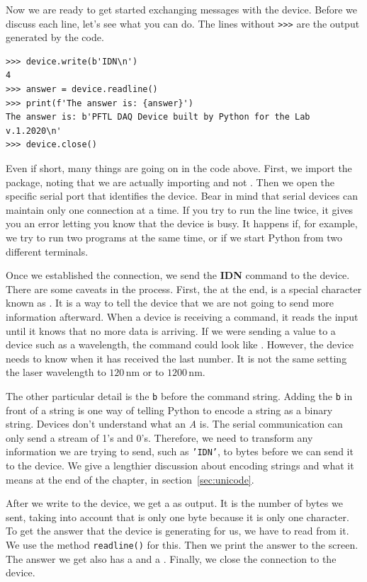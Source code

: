 Now we are ready to get started exchanging messages with the device. Before we discuss each line, let's see what you can do. The lines without \texttt{>>>} are the output generated by the code.

\begin{verbatim}
>>> device.write(b'IDN\n')
4
>>> answer = device.readline()
>>> print(f'The answer is: {answer}')
The answer is: b'PFTL DAQ Device built by Python for the Lab v.1.2020\n'
>>> device.close()
\end{verbatim}

Even if short, many things are going on in the code above. First, we import the  package, noting that we are actually importing  and not . Then we open the specific serial port that identifies the device. Bear in mind that serial devices can maintain only one connection at a time. If you try to run the line twice, it gives you an error letting you know that the device is busy. It happens if, for example, we try to run two programs at the same time, or if we start Python from two different terminals.

Once we established the connection, we send the \textbf{{IDN}} command to the device. There are some caveats in the process. First, the \texttt{\n} at the end, is a special character known as . It is a way to tell the device that we are
not going to send more information afterward. When a device is receiving a command, it reads the input until it knows that no more data is arriving. If we were sending a value to a device such as a wavelength, the command could look like . However, the device needs to know when it has received the last number. It is not the same setting the laser wavelength to $120\,\textrm{nm}$ or to $1200\,\textrm{nm}$.

The other particular detail is the \texttt{b} before the command string. Adding the \texttt{b} in front of a string is one way of telling Python to encode a string as a binary string. Devices don't understand what an \textit{A} is. The serial communication can only send a stream of 1's and 0's. Therefore, we need to transform any information we are trying to send, such as \texttt{'IDN'}, to bytes before we can send it to the device. We give a lengthier discussion about encoding strings and what it means at the end of the chapter, in section~\ref{sec:unicode}.

After we write to the device, we get a  as output. It is the number of bytes we sent, taking into account that \texttt{\n} is only one byte because it is only one character. To get the answer that the device is generating for us, we have to read from it. We use the method \texttt{readline()} for this. Then we print the answer to the screen. The answer we get also has a \py{\n} and a . Finally, we close the connection to the device.

